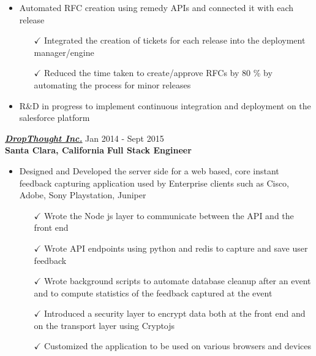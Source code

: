 \begin{itemize} \itemsep -2pt %
 \item Automated RFC creation using remedy APIs and connected it with each release \itemsep -2pt
   \begin{itemize}
     \item[$\checkmark$]  \itemsep -8pt%
   Integrated the creation of tickets for each release into the deployment manager/engine \\
    \item[$\checkmark$]  \itemsep -8pt%
   Reduced the time taken to create/approve RFCs by 80 \% by automating the process for minor releases \\
       \end{itemize}       
\end{itemize}

   \begin{itemize} \itemsep -2pt %
  \item R\&D in progress to implement continuous integration and deployment on the salesforce platform\itemsep -2pt
      \end{itemize}

\vspace{-2pt}
{\sl \href{http://www.dropthought.com}{\textbf{DropThought Inc.}}} \hfill        Jan 2014 - Sept 2015 \\
{\textbf{Santa Clara, California}}       \hfill   \textbf{ Full Stack Engineer}

\begin{itemize} \itemsep -2pt %
 \item Designed and Developed the server side for a web based, core instant feedback capturing application used by Enterprise clients such as Cisco, Adobe, Sony Playstation, Juniper \itemsep -2pt
   \begin{itemize}
     \item[$\checkmark$]  \itemsep -8pt%
   Wrote the Node js layer to communicate between the API and the front end\\
     \item[$\checkmark$]  \itemsep -8pt%
   Wrote API endpoints using python and redis to capture and save user feedback \\
     \item[$\checkmark$]  \itemsep -8pt%
   Wrote background scripts to automate database cleanup after an event and to compute statistics of the feedback captured at the event \\
     \item[$\checkmark$]  \itemsep -8pt%
   Introduced a security layer to encrypt data both at the front end and on the transport layer using Cryptojs\\
    \item[$\checkmark$]  \itemsep -8pt%
   Customized the application to be used on various browsers and devices\\
      \end{itemize}       
\end{itemize}


